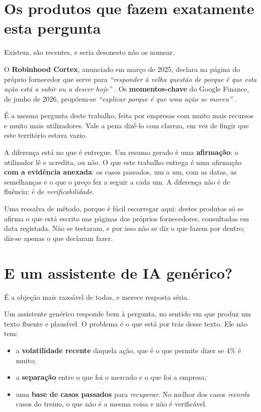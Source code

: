 \section{Os produtos que fazem exatamente esta pergunta}
\label{sec:ctx_produtos}

Existem, são recentes, e seria desonesto não os nomear.

O \textbf{Robinhood Cortex}, anunciado em março de 2025, declara na página do próprio fornecedor que
serve para \emph{``responder à velha questão de porque é que esta ação está a subir ou a descer
hoje''} \autocite{robinhood2025cortex}. Os \textbf{momentos-chave} do Google Finance, de junho de
2026, propõem-se \emph{``explicar porque é que uma ação se moveu''} \autocite{google2026finance}.

É a mesma pergunta deste trabalho, feita por empresas com muito mais recursos e muito mais
utilizadores. Vale a pena dizê-lo com clareza, em vez de fingir que este território estava vazio.

A diferença está no que é entregue. Um resumo gerado é uma \textbf{afirmação}: o utilizador lê e
acredita, ou não. O que este trabalho entrega é uma afirmação \textbf{com a evidência anexada}: os
casos passados, um a um, com as datas, as semelhanças e o que o preço fez a seguir a cada um. A
diferença não é de fluência: é de \emph{verificabilidade}.

Uma ressalva de método, porque é fácil escorregar aqui: destes produtos só se afirma o que está
escrito nas páginas dos próprios fornecedores, consultadas em data registada. Não se testaram, e por
isso não se diz o que fazem por dentro; diz-se apenas o que declaram fazer.

\section{E um assistente de IA genérico?}
\label{sec:ctx_llm}

É a objeção mais razoável de todas, e merece resposta séria.

Um assistente genérico responde bem à pergunta, no sentido em que produz um texto fluente e
plausível. O problema é o que está por trás desse texto. Ele não tem:

\begin{itemize}
  \item a \textbf{volatilidade recente} daquela ação, que é o que permite dizer se 4\% é muito;
  \item a \textbf{separação} entre o que foi o mercado e o que foi a empresa;
  \item uma \textbf{base de casos passados} para \emph{recuperar}. No melhor dos casos
        \emph{recorda} casos do treino, o que não é a mesma coisa e não é verificável.
\end{itemize}

